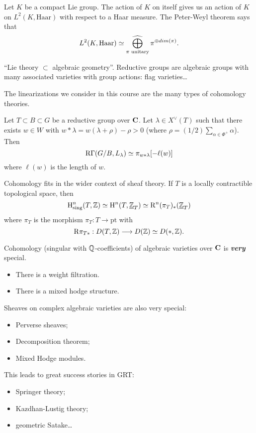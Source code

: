 \begin{example}
Let $K$ be a compact Lie group. The action of $K$ on itself gives us an action of $K$ on
$L^2(K,\text{Haar})$ with respect to a Haar measure. The Peter-Weyl theorem says that
\[
	L^2(K,\text{Haar}) \isoto \cbigoplus_{\pi\text{ unitary}}\pi^{\oplus dim(\pi)}.
\]

``Lie theory $\subset $ algebraic geometry''. Reductive groups are algebraic groups with
many associated varieties with group actions: flag varieties\dots
\end{example}
The linearizations we consider in this course are the many types of cohomology theories.

\begin{example}
Let $T\subset B\subset G$ be a reductive group over $\mathbf{C}$. Let $\lambda\in
X^{\vee}(T)$ such that there exists $w\in W$ with $w*\lambda = w(\lambda+\rho)-\rho>0$
(where $\rho = (1 /2)\sum_{\alpha\in \Phi^{+}}\alpha$). Then
\[
	\mathrm{R}\Gamma(G /B,L_\lambda) \simeq \pi_{w*\lambda}[-\ell(w)]
\]
where $\ell(w)$ is the length of $w$.
\end{example}
Cohomology fits in the wider context of sheaf theory. If $T$ is a locally contractible
topological space, then
\[
\mathrm{H}^{n}_{\text{sing}}(T,\mathbb Z) \simeq \mathrm{H}^{n}(T,\underline{\mathbb{Z}}_T) \simeq \mathrm{R}^{n}(\pi_T)_*(\underline{\mathbb{Z}}_T)	
\]
where $\pi_T$ is the morphism $\pi_T:T\to \text{pt}$ with
\[
\RD\pi_{T*}:D(T,\Z) \to D(\Z) \isoto D(*,\Z)
.\]

Cohomology (singular with $\mathbb Q$-coefficients) of algebraic varieties over $\mathbf{C}$ is
\emph{\textbf{very}} special.
\begin{itemize}
\item There is a weight filtration.
\item There is a mixed hodge structure.
\end{itemize}
Sheaves on complex algebraic varieties are also very special:
\begin{itemize}
\item Perverse sheaves;
\item Decomposition theorem;
\item Mixed Hodge modules.
\end{itemize}
This leads to great success stories in GRT:
\begin{itemize}
\item Springer theory;
\item Kazdhan-Lustig theory;
\item geometric Satake\dots
\end{itemize}

